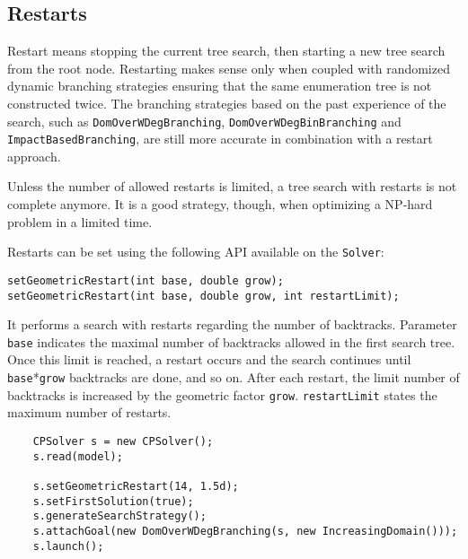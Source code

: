 \subsection{Restarts}\label{solver:restarts}\hypertarget{solver:restarts}{}

Restart means stopping the current tree search, then starting a new tree search from the root node.
Restarting makes sense only when coupled with randomized dynamic branching strategies ensuring that the same enumeration tree is not constructed twice. The branching strategies based on the past experience of the search, such as \texttt{DomOverWDegBranching}, \texttt{DomOverWDegBinBranching} and \texttt{ImpactBasedBranching}, are still more accurate in combination with a restart approach.

Unless the number of allowed restarts is limited, a tree search with restarts is not complete anymore. It is a good strategy, though, when optimizing a NP-hard problem in a limited time.


Restarts can be set using the following API available on the \texttt{Solver}:
\begin{lstlisting}
setGeometricRestart(int base, double grow);
setGeometricRestart(int base, double grow, int restartLimit);
\end{lstlisting}
It performs a search with restarts regarding the number of backtracks. 
Parameter \texttt{base} indicates the maximal number of backtracks allowed in the first search tree. Once this limit is reached, a restart occurs and the search continues until \texttt{base}*\texttt{grow} backtracks are done, and so on. After each restart, the limit number of backtracks is increased by the geometric factor \texttt{grow}. 
\texttt{restartLimit} states the maximum number of restarts.
\begin{lstlisting}
	CPSolver s = new CPSolver();
	s.read(model);
	
	s.setGeometricRestart(14, 1.5d);
	s.setFirstSolution(true);
	s.generateSearchStrategy();
	s.attachGoal(new DomOverWDegBranching(s, new IncreasingDomain()));
	s.launch();
\end{lstlisting}

